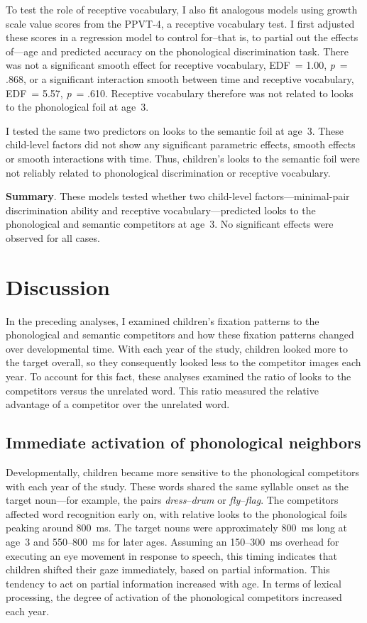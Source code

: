 \documentclass [11pt, proquest] {uwthesis}[2015/03/03]
\begin{document}
To test the role of receptive vocabulary, I also fit analogous models
using growth scale value scores from the PPVT-4, a receptive vocabulary
test. I first adjusted these scores in a regression model to control
for--that is, to partial out the effects of---age and predicted accuracy
on the phonological discrimination task. There was not a significant
smooth effect for receptive vocabulary, EDF~= 1.00, \emph{p}~= .868, or
a significant interaction smooth between time and receptive vocabulary,
EDF~= 5.57, \emph{p}~= .610. Receptive vocabulary therefore was not
related to looks to the phonological foil at age~3.

I tested the same two predictors on looks to the semantic foil at age~3.
These child-level factors did not show any significant parametric
effects, smooth effects or smooth interactions with time. Thus,
children's looks to the semantic foil were not reliably related to
phonological discrimination or receptive vocabulary.

\textbf{Summary}. These models tested whether two child-level
factors---minimal-pair discrimination ability and receptive
vocabulary---predicted looks to the phonological and semantic
competitors at age~3. No significant effects were observed for all
cases.

\section{Discussion}\label{discussion-1}

In the preceding analyses, I examined children's fixation patterns to
the phonological and semantic competitors and how these fixation
patterns changed over developmental time. With each year of the study,
children looked more to the target overall, so they consequently looked
less to the competitor images each year. To account for this fact, these
analyses examined the ratio of looks to the competitors versus the
unrelated word. This ratio measured the relative advantage of a
competitor over the unrelated word.

\subsection{Immediate activation of phonological
neighbors}\label{immediate-activation-of-phonological-neighbors}

Developmentally, children became more sensitive to the phonological
competitors with each year of the study. These words shared the same
syllable onset as the target noun---for example, the pairs
\emph{dress}--\emph{drum} or \emph{fly}--\emph{flag}. The competitors
affected word recognition early on, with relative looks to the
phonological foils peaking around 800~ms. The target nouns were
approximately 800~ms long at age~3 and 550--800~ms for later ages.
Assuming an 150--300~ms overhead for executing an eye movement in
response to speech, this timing indicates that children shifted their
gaze immediately, based on partial information. This tendency to act on
partial information increased with age. In terms of lexical processing,
the degree of activation of the phonological competitors increased each
year.
\end{document}

